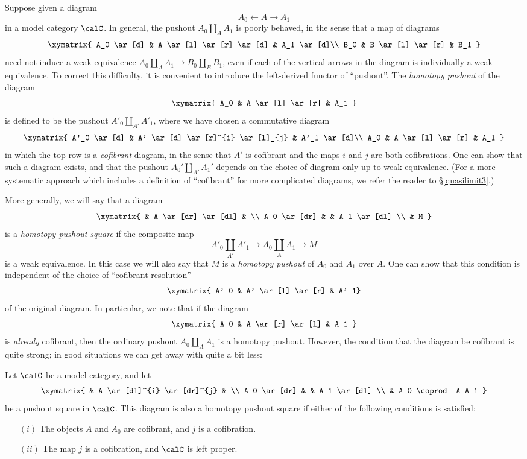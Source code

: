 Suppose given a diagram
$$ A_0 \leftarrow A \rightarrow A_1$$ in a model category $\calC$. In general, the pushout
$ A_0 \coprod_A A_1$ is poorly behaved, in the sense that a map of diagrams
$$ \xymatrix{ A_0 \ar[d] & A \ar[l] \ar[r] \ar[d] & A_1 \ar[d]\\
B_0 & B \ar[l] \ar[r] & B_1 }$$
need not induce a weak equivalence $A_0 \coprod_A A_1 \rightarrow B_0 \coprod_B B_1$, even if
each of the vertical arrows in the diagram is individually a weak equivalence. To correct this difficulty, it is convenient to introduce the left-derived functor of ``pushout''. The {\it homotopy pushout} of the diagram
$$ \xymatrix{ A_0 & A \ar[l] \ar[r] & A_1 } $$
is defined to be the pushout $A'_0 \coprod_{ A' } A'_1$, where we have chosen a commutative diagram
$$ \xymatrix{ A'_0 \ar[d] & A' \ar[d] \ar[r]^{i} \ar[l]_{j} & A'_1 \ar[d]\\
A_0 & A \ar[l] \ar[r] & A_1 } $$
in which the top row is a {\em cofibrant} diagram, in the sense that $A'$ is cofibrant and the maps
$i$ and $j$ are both cofibrations. One can show that such a diagram exists, and that the pushout $A_0' \coprod_{A'} A_1'$ depends on the choice of diagram only up to weak equivalence. (For a more systematic approach which includes a definition of ``cofibrant'' for more complicated diagrams, we refer the reader to \S \ref{quasilimit3}.) 

More generally, we will say that a diagram
$$ \xymatrix{ & A \ar[dr] \ar[dl] & \\
A_0 \ar[dr] & & A_1 \ar[dl] \\
& M }$$
is a {\it homotopy pushout square} if the composite map
$$ A'_0 \coprod_{A'} A'_1 \rightarrow A_0 \coprod_{A} A_1 \rightarrow M$$
is a weak equivalence. In this case we will also say that $M$ is a {\it homotopy pushout} of
$A_0$ and $A_1$ over $A$. One can show that this condition is independent of the choice of
``cofibrant resolution'' $$ \xymatrix{ A'_0 & A' \ar[l] \ar[r] & A'_1}$$ of the original diagram.
In particular, we note that if the diagram
$$ \xymatrix{ A_0 & A \ar[r] \ar[l] & A_1 }$$
is {\em already} cofibrant, then the ordinary pushout $A_0 \coprod_A A_1$ is a homotopy pushout. However, the condition that the diagram be cofibrant is quite strong; in good situations we can get away with quite a bit less:

\begin{proposition}\label{leftpropsquare}
Let $\calC$ be a model category, and let
$$ \xymatrix{ & A \ar[dl]^{i} \ar[dr]^{j} & \\
A_0 \ar[dr] & & A_1 \ar[dl] \\
& A_0 \coprod_A A_1 } $$
be a pushout square in $\calC$. This diagram is also a homotopy pushout square if
either of the following conditions is satisfied:
\begin{itemize}
\item[$(i)$] The objects $A$ and $A_0$ are cofibrant, and $j$ is a cofibration.
\item[$(ii)$] The map $j$ is a cofibration, and $\calC$ is left proper.
\end{itemize}
\end{proposition}

